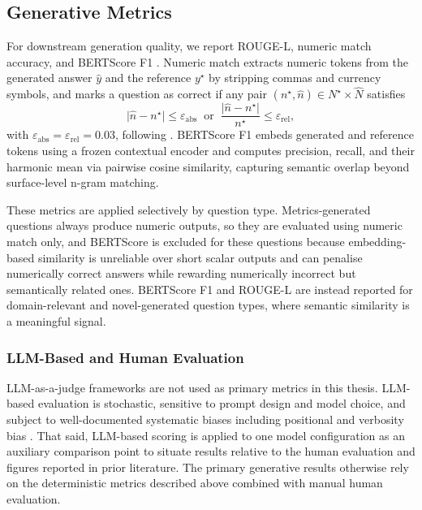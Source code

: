 \documentclass[12pt,twoside,maitrise]{dms}
\theoremstyle{definition}
\numberwithin{equation}{section}
\numberwithin{table}{chapter}
\numberwithin{figure}{chapter}
\begin{document}
\subsection{Generative Metrics}

For downstream generation quality, we report ROUGE-L, numeric match accuracy, and BERTScore F1 \citep{zhang2019bertscore}. Numeric match extracts numeric tokens from the generated answer $\hat{y}$ and the reference $y^\star$ by stripping commas and currency symbols, and marks a question as correct if any pair $(n^\star, \hat{n}) \in N^\star \times \hat{N}$ satisfies
\begin{equation}
  \bigl|\hat{n} - n^\star\bigr| \leq \varepsilon_{\text{abs}}
  \;\;\text{or}\;\;
  \frac{\bigl|\hat{n} - n^\star\bigr|}{n^\star} \leq \varepsilon_{\text{rel}},
\end{equation}
with $\varepsilon_{\text{abs}} = \varepsilon_{\text{rel}} = 0.03$, following \citet{islam2023financebench}. BERTScore F1 embeds generated and reference tokens using a frozen contextual encoder and computes precision, recall, and their harmonic mean via pairwise cosine similarity, capturing semantic overlap beyond surface-level n-gram matching.

These metrics are applied selectively by question type. Metrics-generated questions always produce numeric outputs, so they are evaluated using numeric match only, and BERTScore is excluded for these questions because embedding-based similarity is unreliable over short scalar outputs and can penalise numerically correct answers while rewarding numerically incorrect but semantically related ones. BERTScore F1 and ROUGE-L are instead reported for domain-relevant and novel-generated question types, where semantic similarity is a meaningful signal.

\subsubsection{LLM-Based and Human Evaluation}
\label{sec:llm_eval}
LLM-as-a-judge frameworks are not used as primary metrics in this thesis. LLM-based evaluation is stochastic, sensitive to prompt design and model choice, and subject to well-documented systematic biases including positional and verbosity bias \citep{zheng2023judging}. That said, LLM-based scoring is applied to one model configuration as an auxiliary comparison point to situate results relative to the human evaluation and figures reported in prior literature. The primary generative results otherwise rely on the deterministic metrics described above combined with manual human evaluation.
\end{document}
